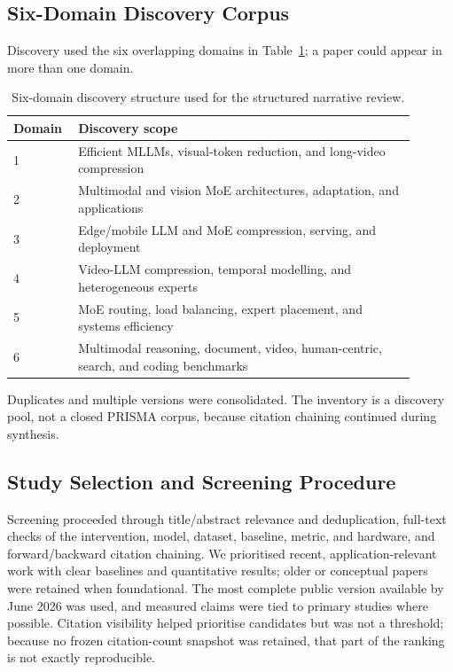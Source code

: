 \documentclass[10pt]{article}
\newenvironment{reviewchange}{\begingroup\color{red}}{\endgroup}
\begin{document}
\begin{reviewchange}
\subsection{Six-Domain Discovery Corpus}

Discovery used the six overlapping domains in Table~\ref{tab:domain-inventory}; a paper
could appear in more than one domain.

\begin{table}[t]
\centering
\caption{Six-domain discovery structure used for the structured narrative review.}
\label{tab:domain-inventory}
\small
\renewcommand{\arraystretch}{1.12}
\setlength{\tabcolsep}{4pt}
\begin{tabular}{p{0.12\linewidth} p{0.78\linewidth}}
\toprule
\textbf{Domain} & \textbf{Discovery scope} \\
\midrule
1 & Efficient MLLMs, visual-token reduction, and long-video compression \\
2 & Multimodal and vision MoE architectures, adaptation, and applications \\
3 & Edge/mobile LLM and MoE compression, serving, and deployment \\
4 & Video-LLM compression, temporal modelling, and heterogeneous experts \\
5 & MoE routing, load balancing, expert placement, and systems efficiency \\
6 & Multimodal reasoning, document, video, human-centric, search, and coding benchmarks \\
\bottomrule
\end{tabular}
\end{table}

Duplicates and multiple versions were consolidated.  The inventory is a discovery
pool, not a closed PRISMA corpus, because citation chaining continued during synthesis.

\subsection{Study Selection and Screening Procedure}

Screening proceeded through title/abstract relevance and deduplication, full-text
checks of the intervention, model, dataset, baseline, metric, and hardware, and
forward/backward citation chaining.  We prioritised recent, application-relevant work
with clear baselines and quantitative results; older or conceptual papers were retained
when foundational.  The most complete public version available by June 2026 was used,
and measured claims were tied to primary studies where possible.  Citation visibility
helped prioritise candidates but was not a threshold; because no frozen citation-count
snapshot was retained, that part of the ranking is not exactly reproducible.


\end{reviewchange}
\end{document}
